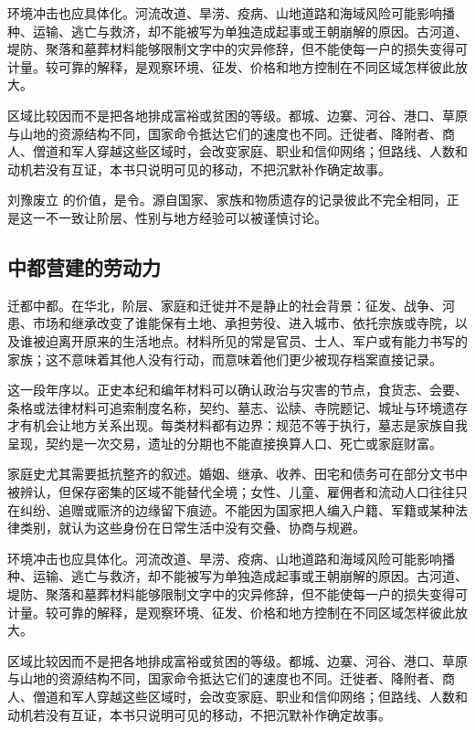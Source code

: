 环境冲击也应具体化。河流改道、旱涝、疫病、山地道路和海域风险可能影响播种、运输、逃亡与救济，却不能被写为单独造成起事或王朝崩解的原因。古河道、堤防、聚落和墓葬材料能够限制文字中的灾异修辞，但不能使每一户的损失变得可计量。较可靠的解释，是观察环境、征发、价格和地方控制在不同区域怎样彼此放大。

区域比较因而不是把各地排成富裕或贫困的等级。都城、边寨、河谷、港口、草原与山地的资源结构不同，国家命令抵达它们的速度也不同。迁徙者、降附者、商人、僧道和军人穿越这些区域时，会改变家庭、职业和信仰网络；但路线、人数和动机若没有互证，本书只说明可见的移动，不把沉默补作确定故事。

刘豫废立 的价值，是令。源自国家、家族和物质遗存的记录彼此不完全相同，正是这一不一致让阶层、性别与地方经验可以被谨慎讨论。

\subsection{中都营建的劳动力}

迁都中都。在华北，阶层、家庭和迁徙并不是静止的社会背景：征发、战争、河患、市场和继承改变了谁能保有土地、承担劳役、进入城市、依托宗族或寺院，以及谁被迫离开原来的生活地点。材料所见的常是官员、士人、军户或有能力书写的家族；这不意味着其他人没有行动，而意味着他们更少被现存档案直接记录。

这一段年序以。正史本纪和编年材料可以确认政治与灾害的节点，食货志、会要、条格或法律材料可追索制度名称，契约、墓志、讼牍、寺院题记、城址与环境遗存才有机会让地方关系出现。每类材料都有边界：规范不等于执行，墓志是家族自我呈现，契约是一次交易，遗址的分期也不能直接换算人口、死亡或家庭财富。

家庭史尤其需要抵抗整齐的叙述。婚姻、继承、收养、田宅和债务可在部分文书中被辨认，但保存密集的区域不能替代全境；女性、儿童、雇佣者和流动人口往往只在纠纷、追赠或赈济的边缘留下痕迹。不能因为国家把人编入户籍、军籍或某种法律类别，就认为这些身份在日常生活中没有交叠、协商与规避。

环境冲击也应具体化。河流改道、旱涝、疫病、山地道路和海域风险可能影响播种、运输、逃亡与救济，却不能被写为单独造成起事或王朝崩解的原因。古河道、堤防、聚落和墓葬材料能够限制文字中的灾异修辞，但不能使每一户的损失变得可计量。较可靠的解释，是观察环境、征发、价格和地方控制在不同区域怎样彼此放大。

区域比较因而不是把各地排成富裕或贫困的等级。都城、边寨、河谷、港口、草原与山地的资源结构不同，国家命令抵达它们的速度也不同。迁徙者、降附者、商人、僧道和军人穿越这些区域时，会改变家庭、职业和信仰网络；但路线、人数和动机若没有互证，本书只说明可见的移动，不把沉默补作确定故事。

